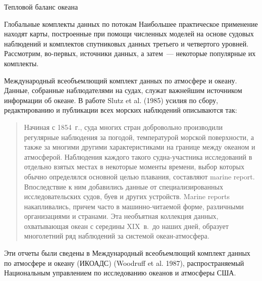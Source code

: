 \begin{chapter}{Тепловой баланс океана}
\begin{section}{Глобальные комплекты данных по потокам}
Наибольшее практическое применение находят карты, построенные при помощи
численных моделей на основе судовых наблюдений и комплектов спутниковых 
данных третьего и четвертого уровней. Рассмотрим, во-первых, источники данных,
а затем~--- некоторые популярные их комплекты.
%

\begin{paragraph}{Международный всеобъемлющий комплект данных по атмосфере 
и океану.}
Данные, собранные наблюдателями на судах, служат важнейшим источником 
информации об океане. В работе Slutz et al. (1985) усилия по сбору, 
редактированию и публикации всех морских наблюдений описываются так:
\begin{quotation}
Начиная с 1854~г., суда многих стран добровольно производили
регулярные наблюдения за погодой, температурой морской 
поверхности, а также за многими другими характеристиками на границе между 
океаном и атмосферой. Наблюдения каждого такого судна-участника исследований 
в отдельно взятых местах в некоторые моменты времени, выбор которых обычно 
определялся основной целью плавания, составляют marine report. 
Впоследствие к ним добавились данные от специализированных 
исследовательских судов, буев и других устройств. Marine reports накапливались,
причем часто в машинно-читаемой форме, различными организациями и странами.
Эта необъятная коллекция данных, охватывающая океан с середины XIX~в.\ до
наших дней, образует многолетний ряд наблюдений за системой океан-атмосфера.
\end{quotation}
Эти отчеты были сведены в Международный всеобъемлющий комплект данных по 
атмосфере и океану (ИКОАДС) (Woodruff et al.  1987), распространяемый
Национальным управлением по исследованию океанов и атмосферы США.
%

\end{paragraph}
\end{section}
\end{chapter}
